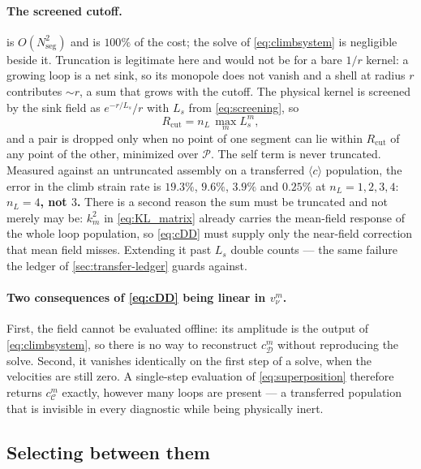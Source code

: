 \documentclass{article}
\newcommand{\cloop}{\ensuremath{\langle c\rangle}}
\begin{document}
\paragraph{The screened cutoff.}  is
$O(N_{\mathrm{seg}}^{2})$ and is $100\%$ of the cost; the solve of
\cref{eq:climbsystem} is negligible beside it. Truncation is legitimate here and
would not be for a bare $1/r$ kernel: a growing loop is a net sink, so its
monopole does not vanish and a shell at radius $r$ contributes $\sim r$, a sum
that grows with the cutoff. The physical kernel is screened by the sink field as
$e^{-r/L_s}/r$ with $L_s$ from \cref{eq:screening}, so
\begin{equation}
  R_{\mathrm{cut}}=n_L\,\max_m L^m_s,
  \label{eq:cutoff}
\end{equation}
and a pair is dropped only when no point of one segment can lie within
$R_{\mathrm{cut}}$ of any point of the other, minimized over $\mathcal P$. The
self term is never truncated. Measured against an untruncated assembly on a
transferred \cloop{} population, the error in the climb strain rate is $19.3\%$,
$9.6\%$, $3.9\%$ and $0.25\%$ at $n_L=1,2,3,4$: \textbf{$n_L=4$, not $3$.} There
is a second reason the sum must be truncated and not merely may be: $k^2_m$ in
\cref{eq:KL_matrix} already carries the mean-field response of the whole loop
population, so \cref{eq:cDD} must supply only the near-field correction that mean
field misses. Extending it past $L_s$ double counts --- the same failure the
ledger of \cref{sec:transfer-ledger} guards against.

\paragraph{Two consequences of \cref{eq:cDD} being linear in $v^m_\nu$.} First,
the field cannot be evaluated offline: its amplitude is the output of
\cref{eq:climbsystem}, so there is no way to reconstruct $c^m_{\mathcal D}$
without reproducing the solve. Second, it vanishes identically on the first step
of a solve, when the velocities are still zero. A single-step evaluation of
\cref{eq:superposition} therefore returns $c^m_{\mathcal C}$ exactly, however many
loops are present --- a transferred population that is invisible in every
diagnostic while being physically inert.

\subsection{Selecting between them}
\label{sec:climb-selection}
\end{document}
